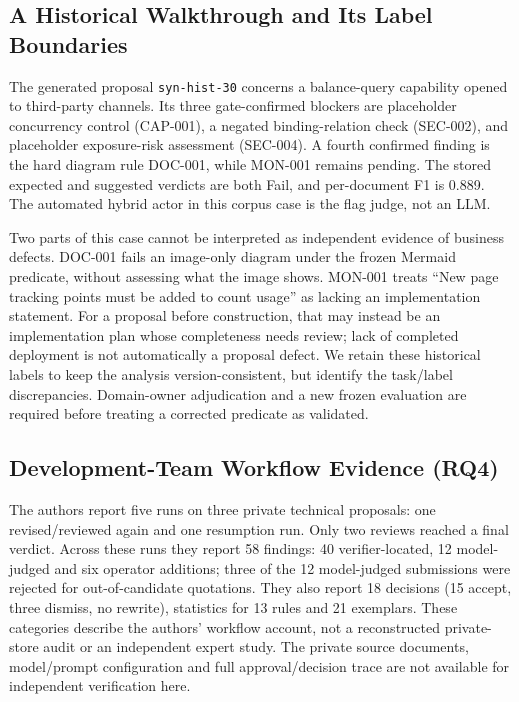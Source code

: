 \documentclass[computers,article,submit,moreauthors]{Definitions/mdpi}
\begin{document}
\subsection{A Historical Walkthrough and Its Label Boundaries}

The generated proposal \texttt{syn-hist-30} concerns a balance-query capability opened to third-party channels. Its three gate-confirmed blockers are placeholder concurrency control (CAP-001), a negated binding-relation check (SEC-002), and placeholder exposure-risk assessment (SEC-004). A fourth confirmed finding is the hard diagram rule DOC-001, while MON-001 remains pending. The stored expected and suggested verdicts are both Fail, and per-document F1 is 0.889. The automated hybrid actor in this corpus case is the flag judge, not an LLM.

Two parts of this case cannot be interpreted as independent evidence of business defects. DOC-001 fails an image-only diagram under the frozen Mermaid predicate, without assessing what the image shows. MON-001 treats ``New page tracking points must be added to count usage'' as lacking an implementation statement. For a proposal before construction, that may instead be an implementation plan whose completeness needs review; lack of completed deployment is not automatically a proposal defect. We retain these historical labels to keep the analysis version-consistent, but identify the task/label discrepancies. Domain-owner adjudication and a new frozen evaluation are required before treating a corrected predicate as validated.

\subsection{Development-Team Workflow Evidence (RQ4)}\label{sec:pilot}

The authors report five runs on three private technical proposals: one revised/reviewed again and one resumption run. Only two reviews reached a final verdict. Across these runs they report 58 findings: 40 verifier-located, 12 model-judged and six operator additions; three of the 12 model-judged submissions were rejected for out-of-candidate quotations. They also report 18 decisions (15 accept, three dismiss, no rewrite), statistics for 13 rules and 21 exemplars. These categories describe the authors' workflow account, not a reconstructed private-store audit or an independent expert study. The private source documents, model/prompt configuration and full approval/decision trace are not available for independent verification here.
\end{document}
